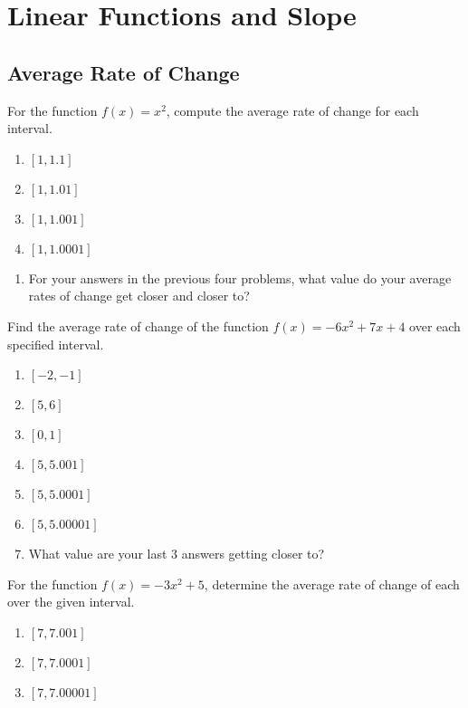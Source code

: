\chapter{Linear Functions and Slope}

\section{Average Rate of Change}

For the function $f(x) = x^2$, compute the average rate of change for each interval.
\begin{enumerate}
\item $[1, 1.1]$
\item $[1, 1.01]$
\item $[1, 1.001]$
\item $[1,1.0001]$
\setcounter{Review}{\value{enumi}}
\end{enumerate}

\begin{enumerate}
\setcounter{enumi}{\value{Review}}
\item For your answers in the previous four problems, what value do your average rates of change get closer and closer to?
\setcounter{Review}{\value{enumi}}
\end{enumerate}

Find the average rate of change of the function $f(x) = -6x^2 + 7x + 4$ over each specified interval.
\begin{enumerate}
\setcounter{enumi}{\value{Review}}
\item $[-2, -1]$
\item $[5, 6]$
\item $[0, 1]$
\item $[5,5.001]$
\item $[5,5.0001]$
\item $[5,5.00001]$
\item What value are your last 3 answers getting closer to?
\setcounter{Review}{\value{enumi}}
\end{enumerate}

For the function $f(x) = -3x^2 + 5$, determine the average rate of change of each over the given interval.
\begin{enumerate}
\setcounter{enumi}{\value{Review}}
    \item $[7, 7.001]$
    \item $[7, 7.0001]$
    \item $[7, 7.00001]$
\setcounter{Review}{\value{enumi}}
\end{enumerate}

